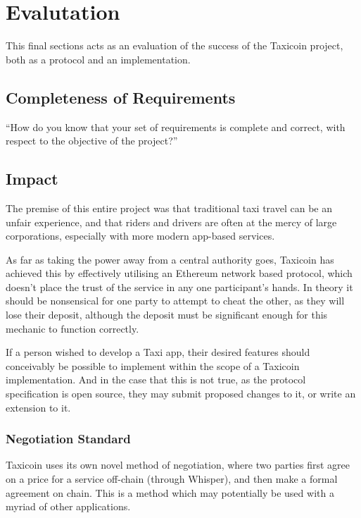 \section{Evalutation}

This final sections acts as an evaluation of the success of the Taxicoin project, both as a protocol and an implementation.

\subsection{Completeness of Requirements}

\enquote{How do you know that your set of requirements is complete and correct, with respect to the objective of the project?}

\subsection{Impact}

The premise of this entire project was that traditional taxi travel can be an unfair experience, and that riders and drivers are often at the mercy of large corporations, especially with more modern app-based services.

As far as taking the power away from a central authority goes, Taxicoin has achieved this by effectively utilising an Ethereum network based protocol, which doesn't place the trust of the service in any one participant's hands. In theory it should be nonsensical for one party to attempt to cheat the other, as they will lose their deposit, although the deposit must be significant enough for this mechanic to function correctly.

If a person wished to develop a Taxi app, their desired features should conceivably be possible to implement within the scope of a Taxicoin implementation. And in the case that this is not true, as the protocol specification is open source, they may submit proposed changes to it, or write an extension to it.

\subsubsection{Negotiation Standard}

Taxicoin uses its own novel method of negotiation, where two parties first agree on a price for a service off-chain (through Whisper), and then make a formal agreement on chain. This is a method which may potentially be used with a myriad of other applications.

